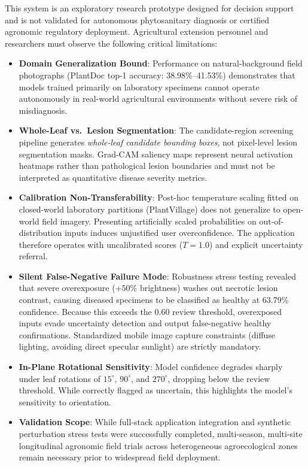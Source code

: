 \documentclass[pdflatex,sn-mathphys-num]{sn-jnl}
\theoremstyle{thmstyleone}%
\theoremstyle{thmstyletwo}%
\theoremstyle{thmstylethree}%
\begin{document}
This system is an exploratory research prototype designed for decision support and is not validated for autonomous phytosanitary diagnosis or certified agronomic regulatory deployment. Agricultural extension personnel and researchers must observe the following critical limitations:
\begin{itemize}
  \item \textbf{Domain Generalization Bound}: Performance on natural-background field photographs (PlantDoc top-1 accuracy: 38.98\%--41.53\%) demonstrates that models trained primarily on laboratory specimens cannot operate autonomously in real-world agricultural environments without severe risk of misdiagnosis.
  \item \textbf{Whole-Leaf vs.\ Lesion Segmentation}: The candidate-region screening pipeline generates \textit{whole-leaf candidate bounding boxes}, not pixel-level lesion segmentation masks. Grad-CAM saliency maps represent neural activation heatmaps rather than pathological lesion boundaries and must not be interpreted as quantitative disease severity metrics.
  \item \textbf{Calibration Non-Transferability}: Post-hoc temperature scaling fitted on closed-world laboratory partitions (PlantVillage) does not generalize to open-world field imagery. Presenting artificially scaled probabilities on out-of-distribution inputs induces unjustified user overconfidence. The application therefore operates with uncalibrated scores ($T=1.0$) and explicit uncertainty referral.
  \item \textbf{Silent False-Negative Failure Mode}: Robustness stress testing revealed that severe overexposure ($+50\%$ brightness) washes out necrotic lesion contrast, causing diseased specimens to be classified as healthy at 63.79\% confidence. Because this exceeds the 0.60 review threshold, overexposed inputs evade uncertainty detection and output false-negative healthy confirmations. Standardized mobile image capture constraints (diffuse lighting, avoiding direct specular sunlight) are strictly mandatory.
  \item \textbf{In-Plane Rotational Sensitivity}: Model confidence degrades sharply under leaf rotations of $15^\circ$, $90^\circ$, and $270^\circ$, dropping below the review threshold. While correctly flagged as uncertain, this highlights the model's sensitivity to orientation.
  \item \textbf{Validation Scope}: While full-stack application integration and synthetic perturbation stress tests were successfully completed, multi-season, multi-site longitudinal agronomic field trials across heterogeneous agroecological zones remain necessary prior to widespread field deployment.
\end{itemize}
\end{document}
